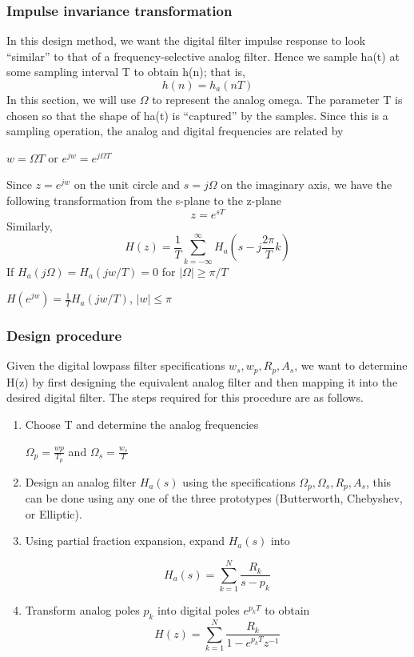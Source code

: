 \documentclass{article}
\begin{document}
\subsubsection{Impulse invariance transformation}
In this design method, we want the digital filter impulse response to look
“similar” to that of a frequency-selective analog filter. Hence we sample
ha(t) at some sampling interval T to obtain h(n); that is,
\begin{equation}
h(n) = h_a(nT)
\end{equation}
In this section, we will use $\Omega$ to represent the analog omega.
The parameter T is chosen so that the shape of ha(t) is “captured” by
the samples. Since this is a sampling operation, the analog and digital
frequencies are related by
\begin{center}
$w = \Omega T$ or $e^{jw}=e^{j\Omega T}$
\end{center}
Since $z = e^{jw}$ on the unit circle and $s= j\Omega$ on the imaginary axis, we have the following transformation from the s-plane to the z-plane
\begin{equation}
z=e^{sT}
\end{equation}
Similarly, 
\begin{equation}
H(z) = \frac{1}{T}\sum_{k=-\infty}^{\infty}H_a(s-j\frac{2\pi}{T}k)
\end{equation}
If $H_a(j\Omega) = H_a(jw/T) = 0$ for $|\Omega| \geq \pi/T$ \\
\begin{center}
    $H(e^{jw})=\frac{1}{T}H_a(jw/T)$, $|w|\leq \pi$
\end{center}
\subsubsection{Design procedure}
Given the digital lowpass filter specifications $w_s, w_p, R_p, A_s$, we want to determine H(z) by first designing the equivalent analog filter and then mapping it into the desired digital filter. The steps required for this procedure are as follows.

\begin{enumerate}
    \item Choose T and determine the analog frequencies
    \begin{center}
        $\Omega_p=\frac{wp}{T_p}$ and $\Omega_s=\frac{w_s}{T}$
    \end{center}
    \item Design an analog filter $H_a(s)$ using the specifications $\Omega_p, \Omega_s, R_p, A_s$, this can be done using any one of the three prototypes (Butterworth, Chebyshev, or Elliptic).
    \item Using partial fraction expansion, expand $H_a(s)$ into 
    \begin{center}
        $$H_a(s) = \sum_{k=1}^{N}\frac{R_k}{s-p_k}$$
    \end{center}
    \item Transform analog poles $p_k$ into digital poles $e^{p_kT}$ to obtain 
    \begin{equation}
        H(z)=\sum_{k=1}^{N}\frac{R_k}{1-e^{p_kT}z^{-1}}
    \end{equation}
\end{enumerate}
\end{document}
